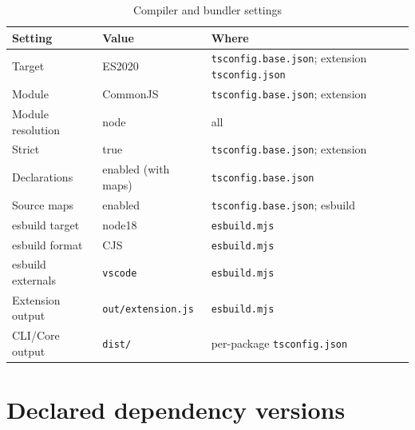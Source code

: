 \begin{longtable}{p{4.6cm}p{3.2cm}p{6.4cm}}
\caption{Compiler and bundler settings}\\
\toprule
\textbf{Setting} & \textbf{Value} & \textbf{Where} \\
\midrule

Target & ES2020 & \texttt{tsconfig.base.json}; extension \texttt{tsconfig.json} \\
Module & CommonJS & \texttt{tsconfig.base.json}; extension \\
Module resolution & node & all \\
Strict & true & \texttt{tsconfig.base.json}; extension \\
Declarations & enabled (with maps) & \texttt{tsconfig.base.json} \\
Source maps & enabled & \texttt{tsconfig.base.json}; esbuild \\
esbuild target & node18 & \texttt{esbuild.mjs} \\
esbuild format & CJS & \texttt{esbuild.mjs} \\
esbuild externals & \texttt{vscode} & \texttt{esbuild.mjs} \\
Extension output & \texttt{out/extension.js} & \texttt{esbuild.mjs} \\
CLI/Core output & \texttt{dist/} & per-package \texttt{tsconfig.json} \\
\bottomrule
\end{longtable}

\section{Declared dependency versions}

